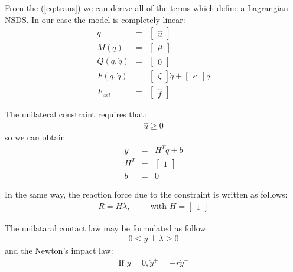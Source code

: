 From the (\ref{eq:trans}) we can derive all of the terms which
define a Lagrangian NSDS. In our case the model is completely
linear:
\begin{eqnarray}
  \nonumber
  q&=& \left[\begin{array}{c}  \hat u  \end{array}\right]    \\
  \nonumber
  M(q)&=&  \left[\begin{array}{c} \mu  \end{array}\right] \\
  \label{eq:lag2}
  Q(q,\dot q )& = &\left[\begin{array}{c} 0  \end{array}\right]  \\
  \nonumber
  F(q, \dot q ) &=&  \left[\begin{array}{c} \zeta \end{array}\right] \dot q +  \left[\begin{array}{c} \kappa  \end{array}\right] q\\
  \nonumber
  F_{ext}& = & \left[\begin{array}{c} \hat f \end{array}\right]
\end{eqnarray}

The unilateral constraint requires that:
\begin{eqnarray}
\label{eq:constr} \nonumber
 \hat u \geq 0
\end{eqnarray}
so we can obtain
\begin{eqnarray}
y &= & H^T q + b \\
\nonumber H^T &=&\left[\begin{array}{c} 1 \end{array}\right]\\
\nonumber b&=&0
\end{eqnarray}

In the same way, the reaction force due to the constraint is
written as follows:
\begin{eqnarray}
\nonumber R=H \lambda, \hspace{1cm}  \text{with }
H=\left[\begin{array}{c} 1
\end{array}\right]
\end{eqnarray}

The unilataral contact law may be formulated as follow:
\begin{eqnarray}
  \label{eq:119}
  0 \leq y \perp \lambda\geq 0
\end{eqnarray}
and the Newton's impact law:
\begin{eqnarray}
  \label{eq:120}
\text{If } y=0, \dot{y}^+ =-r\dot{y}^-
\end{eqnarray}

